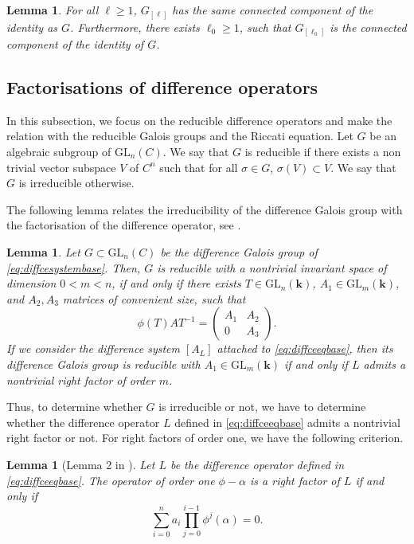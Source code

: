 \documentclass[a4paper,11pt]{amsart}
\renewcommand{\geq}{\geqslant}
\newcommand{\GL}{\operatorname{GL}}
\newtheorem{lem}[thm]{Lemma}
\def\k{\mathbf{k}}
\def\GL{\mathrm{GL}}
\begin{document}
\begin{lem}\label{lem2}
For all $\ell \geq 1$,  $G_{[\ell]}$ has the same connected component of the identity as $G$.  Furthermore,  there exists $\ell_0\geq 1$, such that $G_{[\ell_0]}$ is the connected component of the identity of $G$.
\end{lem}
 



\subsection{Factorisations of difference operators}\label{secfact}
In this subsection, we focus on the reducible difference operators and make the relation with the reducible Galois groups and the Riccati equation.  
Let $G$ be an algebraic subgroup of $\GL_{n}(C)$. We say that $G$ is reducible if there exists a non trivial vector subspace $V$ of $C^n$ such that for all $\sigma\in G$, $\sigma(V)\subset V$.  We say that $G$ is irreducible otherwise. \par 
The following lemma relates the irreducibility of the difference Galois group with the factorisation of the difference operator, see \cite[Lemma 4.4]{adamczewski2021hypertranscendence}.

\begin{lem}\label{lem1}
Let $G\subset \GL_{n}(C)$ be the difference Galois group of \eqref{eq:diffcesystembase}. Then,  $G$ is reducible with a nontrivial invariant space of dimension $0<m<n$, if and only if there exists $T\in \GL_n(\k)$,  $A_1\in \GL_m(\k)$, and $A_2,A_3$ matrices of convenient size,    such that 
$$\phi(T)AT^{-1}=\left(\begin{array}{cc}
A_1 &  A_2\\
0 & A_3  
\end{array}\right).
$$
If we consider the difference system $[A_L]$ attached to \eqref{eq:diffceeqbase}, then its difference Galois group is reducible with $A_1\in \GL_m(\k)$ if and only if
$L$ admits a nontrivial right factor of order $m$.
\end{lem}

Thus, to determine whether $G$ is irreducible or not, we have to determine whether the difference operator $L$ defined in \eqref{eq:diffceeqbase} admits a nontrivial right factor or not.  For right factors of order one, we have the following criterion. 

\begin{lem}[Lemma 2 in \cite{abramov2021rational}]\label{lem:eq left factor}
Let $L$ be the difference operator defined in \eqref{eq:diffceeqbase}.
The operator of order one $\phi-\alpha $ is a right factor of $L$ if and only if 
$$
\sum\limits_{i=0}^n a_i \prod\limits_{j=0}^{i-1} \phi^j(\alpha) = 0.
$$
\end{lem}
\end{document}
